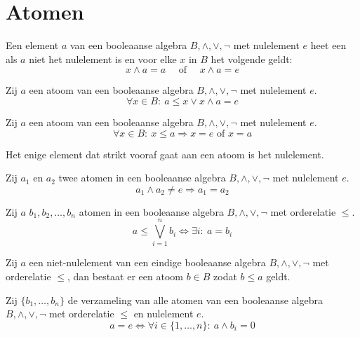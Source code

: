 \documentclass[main.tex]{subfiles}
\begin{document}
\section{Atomen}
\label{sec:atomen}

\begin{de}
  Een element $a$ van een booleaanse algebra $B,\wedge,\vee,\neg$ met nulelement $e$ heet een  als $a$ niet het nulelement is en voor elke $x$ in $B$ het volgende geldt:
  \[ x \wedge a = a \quad\text{ of }\quad x \wedge a = e \]
\end{de}

\begin{st}
  Zij $a$ een atoom van een booleaanse algebra $B,\wedge,\vee,\neg$ met nulelement $e$.
  \[ \forall x\in B:\ a \le x \vee x \wedge a = e \]
\end{st}

\begin{st}
  Zij $a$ een atoom van een booleaanse algebra $B,\wedge,\vee,\neg$ met nulelement $e$.
  \[ \forall x\in B:\ x \le a \Rightarrow x = e \text{ of } x = a \]
\end{st}

\begin{opm}
  Het enige element dat strikt vooraf gaat aan een atoom is het nulelement.
\end{opm}

\begin{st}
  Zij $a_{1}$ en $a_{2}$ twee atomen in een booleaanse algebra $B,\wedge,\vee,\neg$ met nulelement $e$.
  \[ a_{1} \wedge a_{2} \neq e \Rightarrow a_{1} = a_{2} \]
\end{st}

\begin{st}
  Zij $a$ $b_{1}, b_{2}, \dotsc, b_{n}$ atomen in een booleaanse algebra $B,\wedge,\vee,\neg$ met orderelatie $\le$.
  \[ a \le \bigvee_{i=1}^{n}b_{i} \Leftrightarrow \exists i:\ a = b_{i} \]
\end{st}

\begin{st}
  Zij $a$ een niet-nulelement van een eindige booleaanse algebra $B,\wedge,\vee,\neg$ met orderelatie $\le$, dan bestaat er een atoom $b\in B$ zodat $b\le a$ geldt.
\end{st}

\begin{st}
  Zij $\{ b_{1},\dots,b_{n}\}$ de verzameling van alle atomen van een booleaanse algebra $B,\wedge,\vee,\neg$ met orderelatie $\le$ en nulelement $e$.
  \[  a = e \Leftrightarrow \forall i \in \{ 1,\dotsc,n \}:\ a \wedge b_{i} = 0\]
\end{st}
\end{document}
